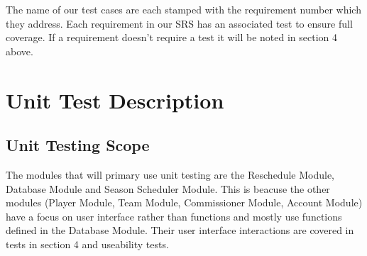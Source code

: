 \documentclass[12pt, titlepage]{article}
\begin{document}
The name of our test cases are each stamped with the requirement number which
they address. Each requirement in our SRS \cite{SRS} has an associated test to
ensure full coverage. If a requirement doesn't require a test it will be
noted in section 4 above.

\section{Unit Test Description}




\subsection{Unit Testing Scope}


The modules that will primary use unit testing are the Reschedule Module,
Database Module and Season Scheduler Module. This is beacuse the other modules
(Player Module, Team Module, Commissioner Module, Account Module) have a focus
on user interface rather than functions and mostly use functions defined in
the Database Module. Their user interface interactions are covered in tests in
section 4 and useability tests.
\end{document}
